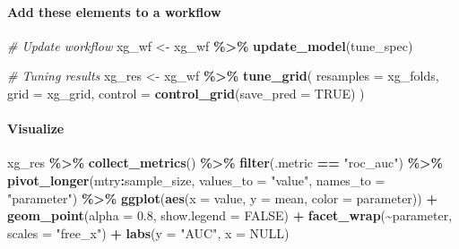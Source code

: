 \documentclass[
]{book}
\newenvironment{Shaded}{\begin{snugshade}}{\end{snugshade}}
\newcommand{\CommentTok}[1]{\textcolor[rgb]{0.56,0.35,0.01}{\textit{#1}}}
\newcommand{\DataTypeTok}[1]{\textcolor[rgb]{0.13,0.29,0.53}{#1}}
\newcommand{\FloatTok}[1]{\textcolor[rgb]{0.00,0.00,0.81}{#1}}
\newcommand{\KeywordTok}[1]{\textcolor[rgb]{0.13,0.29,0.53}{\textbf{#1}}}
\newcommand{\NormalTok}[1]{#1}
\newcommand{\OperatorTok}[1]{\textcolor[rgb]{0.81,0.36,0.00}{\textbf{#1}}}
\newcommand{\OtherTok}[1]{\textcolor[rgb]{0.56,0.35,0.01}{#1}}
\newcommand{\StringTok}[1]{\textcolor[rgb]{0.31,0.60,0.02}{#1}}
\begin{document}
\hypertarget{add-these-elements-to-a-workflow-3}{%
\paragraph{Add these elements to a workflow}\label{add-these-elements-to-a-workflow-3}}

\begin{Shaded}
\begin{Highlighting}[]
\CommentTok{\# Update workflow }
\NormalTok{xg\_wf \textless{}{-}}\StringTok{ }\NormalTok{xg\_wf }\OperatorTok{\%\textgreater{}\%}\StringTok{ }\KeywordTok{update\_model}\NormalTok{(tune\_spec)}

\CommentTok{\# Tuning results }
\NormalTok{xg\_res \textless{}{-}}\StringTok{ }\NormalTok{xg\_wf }\OperatorTok{\%\textgreater{}\%}
\StringTok{  }\KeywordTok{tune\_grid}\NormalTok{(}
    \DataTypeTok{resamples =}\NormalTok{ xg\_folds, }
    \DataTypeTok{grid =}\NormalTok{ xg\_grid,}
    \DataTypeTok{control =} \KeywordTok{control\_grid}\NormalTok{(}\DataTypeTok{save\_pred =} \OtherTok{TRUE}\NormalTok{)}
\NormalTok{  )}
\end{Highlighting}
\end{Shaded}

\hypertarget{visualize-3}{%
\paragraph{Visualize}\label{visualize-3}}

\begin{Shaded}
\begin{Highlighting}[]
\NormalTok{xg\_res }\OperatorTok{\%\textgreater{}\%}
\StringTok{  }\KeywordTok{collect\_metrics}\NormalTok{() }\OperatorTok{\%\textgreater{}\%}\StringTok{ }
\StringTok{  }\KeywordTok{filter}\NormalTok{(.metric }\OperatorTok{==}\StringTok{ "roc\_auc"}\NormalTok{) }\OperatorTok{\%\textgreater{}\%}
\StringTok{  }\KeywordTok{pivot\_longer}\NormalTok{(mtry}\OperatorTok{:}\NormalTok{sample\_size,}
               \DataTypeTok{values\_to =} \StringTok{"value"}\NormalTok{,}
               \DataTypeTok{names\_to =} \StringTok{"parameter"}\NormalTok{) }\OperatorTok{\%\textgreater{}\%}
\StringTok{  }\KeywordTok{ggplot}\NormalTok{(}\KeywordTok{aes}\NormalTok{(}\DataTypeTok{x =}\NormalTok{ value, }\DataTypeTok{y =}\NormalTok{ mean, }\DataTypeTok{color =}\NormalTok{ parameter)) }\OperatorTok{+}
\StringTok{    }\KeywordTok{geom\_point}\NormalTok{(}\DataTypeTok{alpha =} \FloatTok{0.8}\NormalTok{, }\DataTypeTok{show.legend =} \OtherTok{FALSE}\NormalTok{) }\OperatorTok{+}
\StringTok{    }\KeywordTok{facet\_wrap}\NormalTok{(}\OperatorTok{\textasciitilde{}}\NormalTok{parameter, }\DataTypeTok{scales =} \StringTok{"free\_x"}\NormalTok{) }\OperatorTok{+}
\StringTok{    }\KeywordTok{labs}\NormalTok{(}\DataTypeTok{y =} \StringTok{"AUC"}\NormalTok{,}
         \DataTypeTok{x =} \OtherTok{NULL}\NormalTok{)}
\end{Highlighting}
\end{Shaded}
\end{document}
